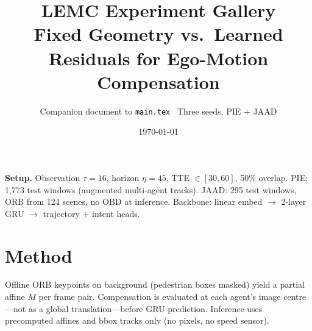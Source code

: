 \documentclass[11pt,a4paper]{article}
\title{\textbf{LEMC Experiment Gallery}\\[4pt]
\large Fixed Geometry vs.\ Learned Residuals for Ego-Motion Compensation}
\author{Companion document to \texttt{main.tex} \textbar\ Three seeds, PIE + JAAD}
\date{\today}
\begin{document}
\maketitle
\thispagestyle{empty}

\begin{center}
\end{center}

\vspace{0.5em}
\noindent\textbf{Setup.} Observation $\tau{=}16$, horizon $\eta{=}45$, TTE $\in[30,60]$, 50\% overlap.
PIE: 1{,}773 test windows (augmented multi-agent tracks).
JAAD: 295 test windows, ORB from 124 scenes, no OBD at inference.
Backbone: linear embed $\rightarrow$ 2-layer GRU $\rightarrow$ trajectory + intent heads.

\section{Method}
\label{sec:method}

Offline ORB keypoints on background (pedestrian boxes masked) yield a partial affine $M$ per frame pair.
Compensation is evaluated at each agent's image centre---not as a global translation---before GRU prediction.
Inference uses precomputed affines and bbox tracks only (no pixels, no speed sensor).
\end{document}
